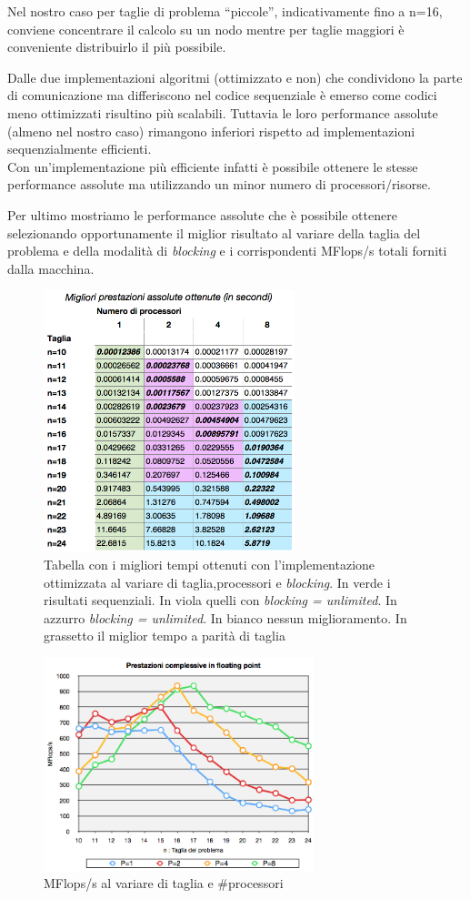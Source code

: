 \documentclass[12pt,a4paper,oneside,openright]{article}
\begin{document}
Nel nostro caso per taglie di problema ``piccole'', indicativamente fino a n=16, conviene concentrare il calcolo su un nodo mentre per taglie maggiori è conveniente distribuirlo il più possibile.

Dalle  due implementazioni algoritmi (ottimizzato e non) che condividono la parte di comunicazione ma differiscono nel codice sequenziale è emerso come codici meno ottimizzati risultino più scalabili. Tuttavia le loro performance assolute (almeno nel nostro caso) rimangono inferiori rispetto ad implementazioni sequenzialmente efficienti.\\ Con un'implementazione più efficiente infatti è possibile ottenere le stesse performance assolute ma utilizzando un minor numero di processori/risorse.

Per ultimo mostriamo le performance assolute che è possibile ottenere selezionando opportunamente il miglior risultato al variare della taglia del problema e della modalità di \emph{blocking} e i corrispondenti MFlops/s totali forniti dalla macchina.
\begin{figure}[htp] 
  \centering
  \linespread{1}
      \includegraphics[width=0.65\textwidth]{immagini/best_performance}
  \caption{\small Tabella con i migliori tempi ottenuti con l'implementazione ottimizzata al variare di taglia,processori e \emph{blocking}. In verde i risultati sequenziali. In viola quelli con \emph{blocking = unlimited}. In azzurro \emph{blocking = unlimited}. In bianco nessun miglioramento. In grassetto il miglior tempo a parità di taglia}
\end{figure}

\begin{figure}[htp] 
  \centering
      \includegraphics[width=0.70\textwidth]{immagini/mflips}
  \caption{\small MFlops/s al variare di taglia e \#processori}
\end{figure}
\end{document}
